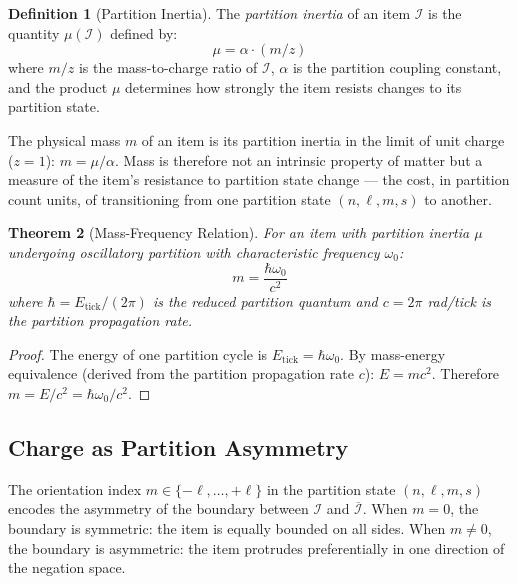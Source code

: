 \documentclass[11pt,twocolumn,a4paper]{article}
\theoremstyle{plain}
\newtheorem{theorem}{Theorem}[section]
\theoremstyle{definition}
\newtheorem{definition}[theorem]{Definition}
\theoremstyle{remark}
\begin{document}
\begin{definition}[Partition Inertia]
\label{def:inertia}
The \emph{partition inertia} of an item $\mathcal{I}$ is the quantity
$\mu(\mathcal{I})$ defined by:
\begin{equation}
    \mu = \alpha \cdot (m/z)
    \label{eq:inertia}
\end{equation}
where $m/z$ is the mass-to-charge ratio of $\mathcal{I}$, $\alpha$ is the
partition coupling constant, and the product $\mu$ determines how strongly the
item resists changes to its partition state.
\end{definition}

The physical mass $m$ of an item is its partition inertia in the limit of unit
charge ($z = 1$): $m = \mu/\alpha$. Mass is therefore not an intrinsic property
of matter but a measure of the item's resistance to partition state change ---
the cost, in partition count units, of transitioning from one partition state
$(n,\ell,m,s)$ to another.

\begin{theorem}[Mass-Frequency Relation]
\label{thm:mass_freq}
For an item with partition inertia $\mu$ undergoing oscillatory partition with
characteristic frequency $\omega_0$:
\begin{equation}
    m = \frac{\hbar \omega_0}{c^2}
    \label{eq:mass_freq}
\end{equation}
where $\hbar = E_{\mathrm{tick}}/(2\pi)$ is the reduced partition quantum and
$c = 2\pi$ rad/tick is the partition propagation rate.
\end{theorem}

\begin{proof}
The energy of one partition cycle is $E_{\mathrm{tick}} = \hbar \omega_0$.
By mass-energy equivalence (derived from the partition propagation rate $c$):
$E = mc^2$. Therefore $m = E/c^2 = \hbar\omega_0/c^2$.
\end{proof}

\subsection{Charge as Partition Asymmetry}
\label{subsec:charge}

The orientation index $m \in \{-\ell, \ldots, +\ell\}$ in the partition state
$(n,\ell,m,s)$ encodes the asymmetry of the boundary between $\mathcal{I}$ and
$\overline{\mathcal{I}}$. When $m = 0$, the boundary is symmetric: the item is
equally bounded on all sides. When $m \neq 0$, the boundary is asymmetric: the
item protrudes preferentially in one direction of the negation space.
\end{document}
